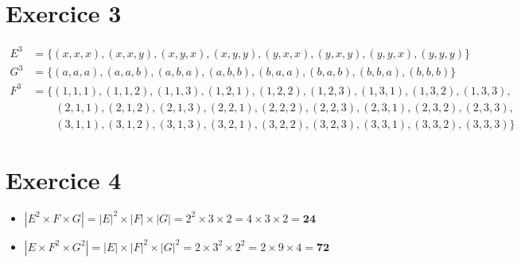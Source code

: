 \documentclass[12pt,a4paper]{article}
\begin{document}
\section*{Exercice 3}
\begin{align*}
    E^3 &= \{ (x, x, x), (x, x, y), (x, y, x), (x, y, y), (y, x, x), (y, x, y), (y, y, x), (y, y, y) \} \\[10pt]
    G^3 &= \{ (a, a, a), (a, a, b), (a, b, a), (a, b, b), (b, a, a), (b, a, b), (b, b, a), (b, b, b) \} \\[10pt]
    F^3 &= \{ (1, 1, 1), (1, 1, 2), (1, 1, 3), (1, 2, 1), (1, 2, 2), (1, 2, 3), (1, 3, 1), (1, 3, 2), (1, 3, 3), \\
        &\phantom{=\{ \ } (2, 1, 1), (2, 1, 2), (2, 1, 3), (2, 2, 1), (2, 2, 2), (2, 2, 3), (2, 3, 1), (2, 3, 2), (2, 3, 3), \\
        &\phantom{=\{ \ } (3, 1, 1), (3, 1, 2), (3, 1, 3), (3, 2, 1), (3, 2, 2), (3, 2, 3), (3, 3, 1), (3, 3, 2), (3, 3, 3) \}
\end{align*}

\section*{Exercice 4}
\begin{itemize}
    \item $|E^2 \times F \times G| = |E|^2 \times |F| \times |G| = 2^2 \times 3 \times 2 = 4 \times 3 \times 2 = \mathbf{24}$
    \item $|E \times F^2 \times G^2| = |E| \times |F|^2 \times |G|^2 = 2 \times 3^2 \times 2^2 = 2 \times 9 \times 4 = \mathbf{72}$
\end{itemize}
\end{document}

